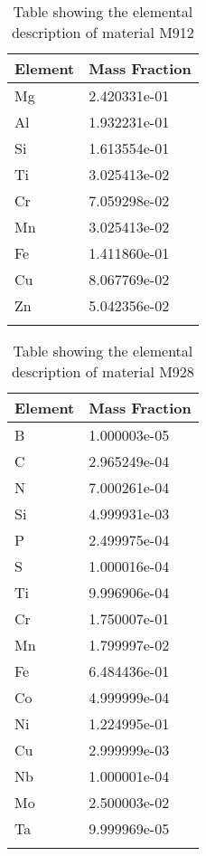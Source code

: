 \begin{centering}
\begin{longtable}[ht!]
  { p{} | p{} }
\hline
Element & Mass Fraction\\
\hline
Mg &  2.420331e-01\\
Al &  1.932231e-01\\
Si &  1.613554e-01\\
Ti &  3.025413e-02\\
Cr &  7.059298e-02\\
Mn &  3.025413e-02\\
Fe &  1.411860e-01\\
Cu &  8.067769e-02\\
Zn &  5.042356e-02\\
\caption{Table showing the elemental description of material M912}
\label{table:material_UppExFrames}
\end{longtable}
\clearpage

\begin{longtable}[ht!]
{ p{} | p{} }
\hline
Element & Mass Fraction\\
\hline
B &  1.000003e-05\\
C &  2.965249e-04\\
N &  7.000261e-04\\
Si &  4.999931e-03\\
P &  2.499975e-04\\
S &  1.000016e-04\\
Ti &  9.996906e-04\\
Cr &  1.750007e-01\\
Mn &  1.799997e-02\\
Fe &  6.484436e-01\\
Co &  4.999999e-04\\
Ni &  1.224995e-01\\
Cu &  2.999999e-03\\
Nb &  1.000001e-04\\
Mo &  2.500003e-02\\
Ta &  9.999969e-05\\
\caption{Table showing the elemental description of material M928}
\label{table:material_PPF}
\end{longtable}
\clearpage


\end{centering}
